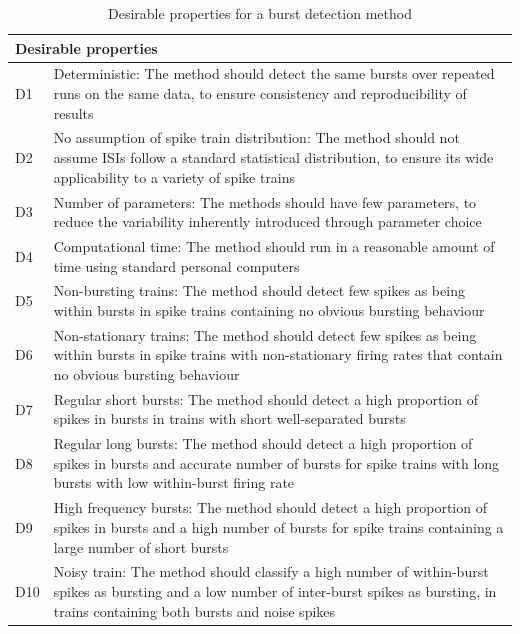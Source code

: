 \documentclass[12pt, titlepage]{article}
\begin{document}
	\begin{table}[h] \centering 	{}
		\begin{tabular}{|l|m{13cm}|}
			\hline \multicolumn{2}{|l|}{Desirable properties}
			\\ \hline
			D1 & Deterministic: The method should detect the same bursts over repeated runs on the same  data, to ensure consistency and reproducibility of results
			\\ D2 & No assumption of spike train distribution: The method should not assume ISIs follow a standard statistical  
			distribution, to ensure its wide applicability to a variety of spike trains
			\\  D3 & Number of parameters: The methods should have few parameters, to reduce the variability inherently introduced through parameter choice
			\\D4 & Computational time: The method should run in a reasonable amount of time using standard personal computers
			\\ D5 & Non-bursting trains: The method should detect few spikes as being within bursts in spike trains containing no obvious bursting behaviour
			\\D6 & Non-stationary trains: The method should detect few spikes as being within bursts in spike trains with non-stationary firing rates that contain no obvious bursting behaviour 
			\\ D7 & Regular short bursts: The method should detect a high proportion of spikes in bursts in trains with short well-separated bursts
			\\D8 & Regular long bursts: The method should detect a high proportion of spikes in bursts and accurate  number of bursts for spike trains with long bursts with low within-burst firing rate
			\\  D9 & High frequency bursts: The method should detect a high proportion of spikes in bursts and  a high number of bursts  for spike trains containing a large number of short bursts
			\\D10 & Noisy train: The method should classify a high number of within-burst spikes as bursting and a low number of inter-burst spikes as bursting, in trains containing both bursts and noise spikes
			\\ \hline
		\end{tabular} \caption{Desirable properties for a burst detection method}
		\label{des_prop}
	\end{table}
\end{document}
